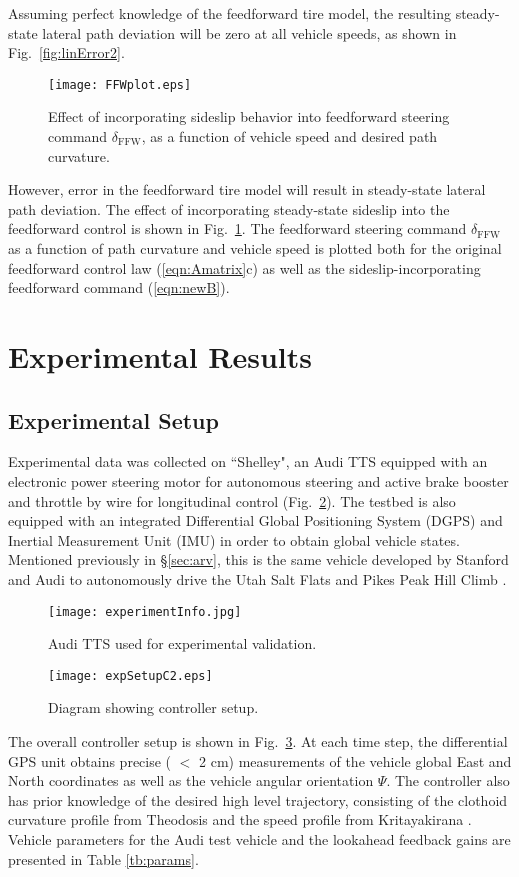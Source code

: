 Assuming perfect knowledge of the feedforward tire model, the resulting steady-state lateral path deviation will be zero at all vehicle speeds,
as shown in Fig.~\ref{fig:linError2}.
\begin{figure}[h]
\centering
\texttt{[image: FFWplot.eps]}
\caption{Effect of incorporating sideslip behavior into feedforward steering command $\delta_\mathrm{FFW}$, as a function of 
vehicle speed and desired path curvature.}
\label{fig:ffwplot}
\end{figure}
However, error in the feedforward tire model will result in steady-state lateral path deviation.
The effect of incorporating steady-state sideslip into the feedforward control is shown in Fig.~\ref{fig:ffwplot}. The feedforward
steering command $\delta_\mathrm{FFW}$ as a function of path curvature and vehicle speed is plotted both for the original feedforward control law (\ref{eqn:Amatrix}c) as well as the sideslip-incorporating
feedforward command (\ref{eqn:newB}). 

\section{Experimental Results}
\label{sec:expresults}

\subsection{Experimental Setup}

Experimental data was collected on ``Shelley", an Audi TTS equipped 
with an electronic power steering motor for autonomous steering and active brake booster and throttle by wire for
longitudinal control (Fig.~\ref{fig:shelleyPicC2}). The testbed is also
equipped with an integrated Differential Global Positioning System (DGPS) and Inertial Measurement Unit (IMU) in order to obtain
 global vehicle states. Mentioned previously in \S \ref{sec:arv}, this is the same vehicle developed by
Stanford and Audi to autonomously drive the Utah Salt Flats and Pikes Peak Hill Climb \cite{saltflats}. 

\begin{figure}[h]
\centering
\texttt{[image: experimentInfo.jpg]}
\caption{Audi TTS used for experimental validation.}
\label{fig:shelleyPicC2}
\end{figure}

\begin{figure}[h]
\centering
\texttt{[image: expSetupC2.eps]}
\caption{Diagram showing controller setup.}
\label{fig:expSetupC2}
\end{figure}
\newpage 
The overall controller setup is shown in Fig.~\ref{fig:expSetupC2}. At each time step,
the differential GPS unit obtains precise ( $<$ 2 cm) measurements of the vehicle
 global East and North coordinates as well as the vehicle angular orientation $\Psi$.
 The controller also has prior knowledge of the desired high level trajectory, 
 consisting of the clothoid curvature profile from Theodosis \cite{theodosis} and 
 the speed profile from Kritayakirana \cite{mickthesis}. 
Vehicle parameters for the Audi test vehicle and the lookahead feedback
 gains are presented in Table \ref{tb:params}.

